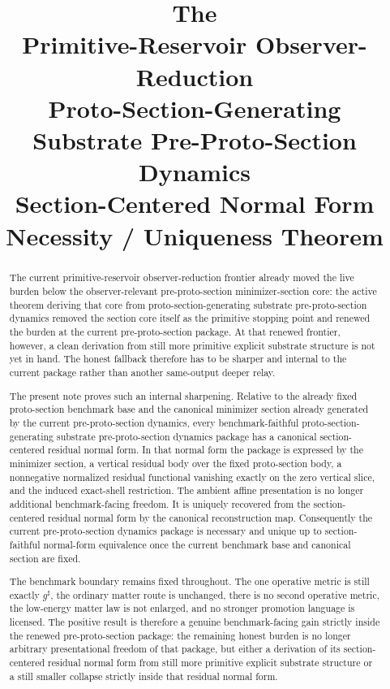 \documentclass[11pt]{article}
\title{\textbf{The \TheoryName{}}\\[0.4em]
\large Primitive-Reservoir Observer-Reduction\\
\large Proto-Section-Generating Substrate Pre-Proto-Section Dynamics\\
\large Section-Centered Normal Form Necessity / Uniqueness Theorem}
\author{}
\date{}
\newcommand{\CompletedMetric}{g^{\sharp}}
\begin{document}
\maketitle

\begin{abstract}
The current primitive-reservoir observer-reduction frontier already moved the live burden below the observer-relevant pre-proto-section minimizer-section core: the active theorem deriving that core from proto-section-generating substrate pre-proto-section dynamics removed the section core itself as the primitive stopping point and renewed the burden at the current pre-proto-section package. At that renewed frontier, however, a clean derivation from still more primitive explicit substrate structure is not yet in hand. The honest fallback therefore has to be sharper and internal to the current package rather than another same-output deeper relay.

The present note proves such an internal sharpening. Relative to the already fixed proto-section benchmark base and the canonical minimizer section already generated by the current pre-proto-section dynamics, every benchmark-faithful proto-section-generating substrate pre-proto-section dynamics package has a canonical section-centered residual normal form. In that normal form the package is expressed by the minimizer section, a vertical residual body over the fixed proto-section body, a nonnegative normalized residual functional vanishing exactly on the zero vertical slice, and the induced exact-shell restriction. The ambient affine presentation is no longer additional benchmark-facing freedom. It is uniquely recovered from the section-centered residual normal form by the canonical reconstruction map. Consequently the current pre-proto-section dynamics package is necessary and unique up to section-faithful normal-form equivalence once the current benchmark base and canonical section are fixed.

The benchmark boundary remains fixed throughout. The one operative metric is still exactly \(\CompletedMetric\), the ordinary matter route is unchanged, there is no second operative metric, the low-energy matter law is not enlarged, and no stronger promotion language is licensed. The positive result is therefore a genuine benchmark-facing gain strictly inside the renewed pre-proto-section package: the remaining honest burden is no longer arbitrary presentational freedom of that package, but either a derivation of its section-centered residual normal form from still more primitive explicit substrate structure or a still smaller collapse strictly inside that residual normal form.
\end{abstract}
\end{document}
